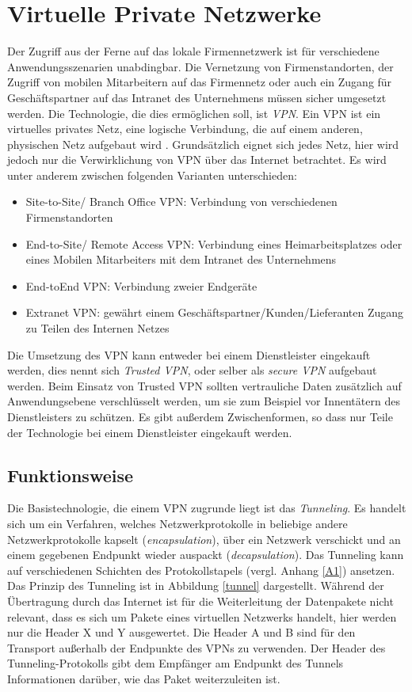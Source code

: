 \chapter{Virtuelle Private Netzwerke}

Der Zugriff aus der Ferne auf das lokale Firmennetzwerk ist für verschiedene Anwendungsszenarien unabdingbar. Die Vernetzung von Firmenstandorten, der Zugriff von mobilen Mitarbeitern auf das Firmennetz oder auch ein Zugang für Geschäftspartner auf das Intranet des Unternehmens müssen sicher umgesetzt werden.
Die Technologie, die dies ermöglichen soll, ist \emph{VPN}. Ein VPN ist ein virtuelles privates Netz, eine logische Verbindung, die auf einem anderen, physischen Netz aufgebaut wird \cite{zisler2018computer}. Grundsätzlich eignet sich jedes Netz, hier wird jedoch nur die Verwirklichung von VPN über das Internet betrachtet. Es wird unter anderem zwischen folgenden Varianten unterschieden:
\begin{itemize}
  \item Site-to-Site/ Branch Office VPN: Verbindung von verschiedenen Firmenstandorten
  \item End-to-Site/ Remote Access VPN: Verbindung eines Heimarbeitsplatzes oder eines Mobilen Mitarbeiters mit dem Intranet des Unternehmens
  \item End-toEnd VPN: Verbindung zweier Endgeräte
  \item Extranet VPN: gewährt einem Geschäftspartner/Kunden/Lieferanten Zugang zu Teilen des Internen Netzes 
\end{itemize}

Die Umsetzung des VPN kann entweder bei einem Dienstleister eingekauft werden, dies nennt sich \emph{Trusted VPN}, oder selber als \emph{secure VPN} aufgebaut werden. Beim Einsatz von Trusted VPN sollten vertrauliche Daten zusätzlich auf Anwendungsebene verschlüsselt werden, um sie zum Beispiel vor Innentätern des Dienstleisters zu schützen. 
 Es gibt außerdem Zwischenformen, so dass nur Teile der Technologie bei einem Dienstleister eingekauft werden.


\section{Funktionsweise}

Die Basistechnologie, die einem VPN zugrunde liegt ist das \emph{Tunneling}. Es handelt sich um ein Verfahren, welches  Netzwerkprotokolle in beliebige andere Netzwerkprotokolle kapselt (\emph{encapsulation}), über ein Netzwerk verschickt und an einem gegebenen Endpunkt wieder auspackt (\emph{decapsulation}). Das Tunneling kann auf verschiedenen Schichten des Protokollstapels (vergl. Anhang \ref{A1}) ansetzen. Das Prinzip des Tunneling ist in Abbildung \ref{tunnel} dargestellt. Während der Übertragung durch das Internet ist für die Weiterleitung der Datenpakete nicht relevant, dass es sich um Pakete eines virtuellen Netzwerks handelt, hier werden nur die Header X und Y ausgewertet. Die Header A und B sind für den Transport außerhalb der Endpunkte des VPNs zu verwenden. Der Header des Tunneling-Protokolls gibt dem Empfänger am Endpunkt des Tunnels Informationen darüber, wie das Paket weiterzuleiten ist. 

